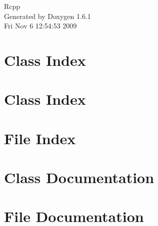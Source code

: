 \documentclass[a4paper]{book}
\begin{document}
\hypersetup{pageanchor=false}
\begin{titlepage}
\vspace*{7cm}
\begin{center}
{\Large Rcpp }\\
\vspace*{1cm}
{\large Generated by Doxygen 1.6.1}\\
\vspace*{0.5cm}
{\small Fri Nov 6 12:54:53 2009}\\
\end{center}
\end{titlepage}
\clearemptydoublepage
{}
\tableofcontents
\clearemptydoublepage
{}
\hypersetup{pageanchor=true}
\chapter{Class Index}

\chapter{Class Index}

\chapter{File Index}

\chapter{Class Documentation}



















\chapter{File Documentation}





\printindex
\end{document}
